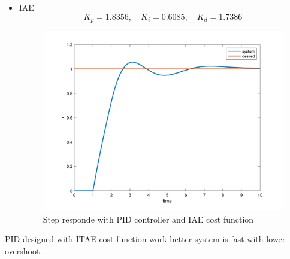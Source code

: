 \begin{itemize}
\begin{figure}[H]
   \end{figure}
   \item IAE
   $$
   K_p = 1.8356, \quad K_i = 0.6085, \quad K_d = 1.7386
   $$
   \begin{figure}[H]
      \caption{Step responde with PID controller and IAE cost function}
      \centering
      \includegraphics[width=11cm]{../Figure/Q1/IAE.png}
  \end{figure}
 \end{itemize}
 PID designed with ITAE cost function work better system is fast with lower overshoot.